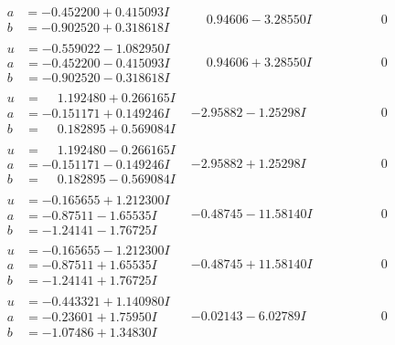 \documentclass[1p]{elsarticle_modified}
\theoremstyle{definition}
\begin{document}
$$\begin{array}{c|c|c}
\begin{aligned}
a &= -0.452200 + 0.415093 I \\
b &= -0.902520 + 0.318618 I\end{aligned}
 & \phantom{-}0.94606 - 3.28550 I & \phantom{-0.000000 } 0 \\ \hline\begin{aligned}
u &= -0.559022 - 1.082950 I \\
a &= -0.452200 - 0.415093 I \\
b &= -0.902520 - 0.318618 I\end{aligned}
 & \phantom{-}0.94606 + 3.28550 I & \phantom{-0.000000 } 0 \\ \hline\begin{aligned}
u &= \phantom{-}1.192480 + 0.266165 I \\
a &= -0.151171 + 0.149246 I \\
b &= \phantom{-}0.182895 + 0.569084 I\end{aligned}
 & -2.95882 - 1.25298 I & \phantom{-0.000000 } 0 \\ \hline\begin{aligned}
u &= \phantom{-}1.192480 - 0.266165 I \\
a &= -0.151171 - 0.149246 I \\
b &= \phantom{-}0.182895 - 0.569084 I\end{aligned}
 & -2.95882 + 1.25298 I & \phantom{-0.000000 } 0 \\ \hline\begin{aligned}
u &= -0.165655 + 1.212300 I \\
a &= -0.87511 - 1.65535 I \\
b &= -1.24141 - 1.76725 I\end{aligned}
 & -0.48745 - 11.58140 I & \phantom{-0.000000 } 0 \\ \hline\begin{aligned}
u &= -0.165655 - 1.212300 I \\
a &= -0.87511 + 1.65535 I \\
b &= -1.24141 + 1.76725 I\end{aligned}
 & -0.48745 + 11.58140 I & \phantom{-0.000000 } 0 \\ \hline\begin{aligned}
u &= -0.443321 + 1.140980 I \\
a &= -0.23601 + 1.75950 I \\
b &= -1.07486 + 1.34830 I\end{aligned}
 & -0.02143 - 6.02789 I & \phantom{-0.000000 } 0 \\ \hline\begin{aligned}

\end{aligned}
\end{array}$$
\end{document}
